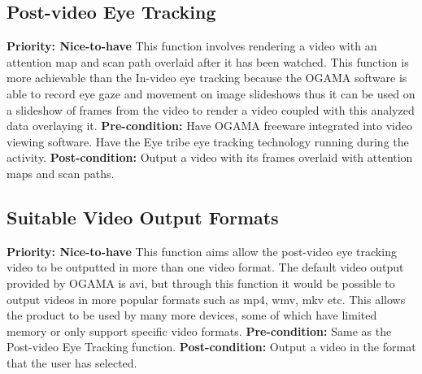 \subsection{Post-video Eye Tracking}
    \textbf{Priority: Nice-to-have}\newline
    This function involves rendering a video with an attention map and scan path overlaid after it has been watched. This function is more achievable than the In-video eye tracking because the OGAMA software is able to record eye gaze and movement on image slideshows thus it can be used on a slideshow of frames from the video to render a video coupled with this analyzed data overlaying it.\newline
\textbf{Pre-condition: }Have OGAMA freeware integrated into video viewing software. Have the Eye tribe eye tracking technology running during the activity.\newline   
\textbf{Post-condition: }Output a video with its frames overlaid with attention maps and scan paths.

\subsection{Suitable Video Output Formats} 
    \textbf{Priority: Nice-to-have}\newline
    This function aims allow the post-video eye tracking video to be outputted in more than one video format. The default video output provided by OGAMA is avi, but through this function it would be possible to output videos in more popular formats such as mp4, wmv, mkv etc. This allows the product to be used by many more devices, some of which have limited memory or only support specific video formats.\newline
    \textbf{Pre-condition: }Same as the Post-video Eye Tracking function.\newline 
    \textbf{Post-condition: }Output a video in the format that the user has selected.

